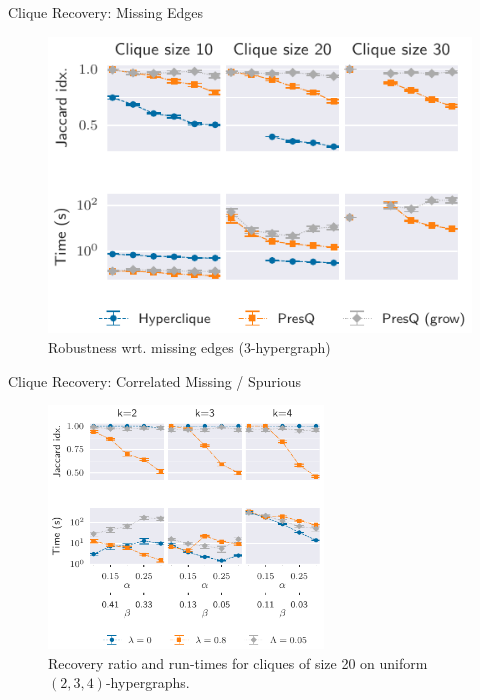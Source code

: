 \documentclass[10pt,compress]{beamer}
\begin{document}
\begin{frame}{Clique Recovery: Missing Edges}
    \begin{figure}
        \centering
        \includegraphics{3hyper_alpha}
        \caption{Robustness wrt. missing edges (3-hypergraph)}
    \end{figure}
\end{frame}

\begin{frame}{Clique Recovery: Correlated Missing / Spurious}
\begin{figure}
    \centering
    \includegraphics[width=0.65\textwidth]{quasi_corr_20}
    \caption{
    Recovery ratio and run-times for cliques of size 20 on uniform $(2,3,4)$-hypergraphs.
    }
\end{figure}

\end{frame}
\end{document}
